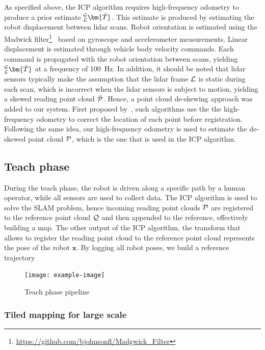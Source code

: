 As specified above, the \ac{ICP} algorithm requires high-frequency odometry to produce a prior estimate $_{\lidarf}^{\mapf}\bm{\check{T}}$.
This estimate is produced by estimating the robot displacement between lidar scans. 
Robot orientation is estimated using the Madwick filter\footnote{\url{https://github.com/bjohnsonfl/Madgwick_Filter}}~\citep{Madgwick2011} based on gyroscope and accelerometer measurements.
Linear displacement is estimated through vehicle body velocity commands.
Each command is propagated with the robot orientation between scans, yielding $_{\lidarf}^{\mapf}\bm{\check{T}}$ at a frequency of \SI{100}{Hz}.
In addition, it should be noted that lidar sensors typically make the assumption that the lidar frame $\mathcal{L}$ is static during each scan, which is incorrect when the lidar sensors is subject to motion, yielding a skewed reading point cloud $\check{\mathcal{P}}$.
Hence, a point cloud de-skewing approach was added to our system.
First proposed by~\citet{Bosse2009}, such algorithms use the the high-frequency odometry to correct the location of each point before registration.
Following the same idea, our high-frequency odometry is used to estimate the de-skewed point cloud $\mathcal{P}$, which is the one that is used in the \ac{ICP} algorithm.


\subsection{Teach phase}
\label{sec:teach_phase}

During the teach phase, the robot is driven along a specific path by a human operator, while all sensors are used to collect data.
The \ac{ICP} algorithm is used to solve the \ac{SLAM} problem, hence incoming reading point clouds $\mathcal{P}$ are registered to the reference point cloud $\mathcal{Q}$ and then appended to the reference, effectively building a map.
The other output of the \ac{ICP} algorithm, the transform that allows to register the reading point cloud to the reference point cloud \transform{\lidarf}{\mapf} represents the pose of the robot $\bm x$.
By logging all robot poses, we build a reference trajectory


\begin{figure} [htpb]
	\centering
	\texttt{[image: example-image]}
	\caption{Teach phase pipeline}
	\label{fig:teach_pipeline}
\end{figure}

\subsubsection{Tiled mapping for large scale}
\label{sec:tiled_map}
\lightlipsum[1]

